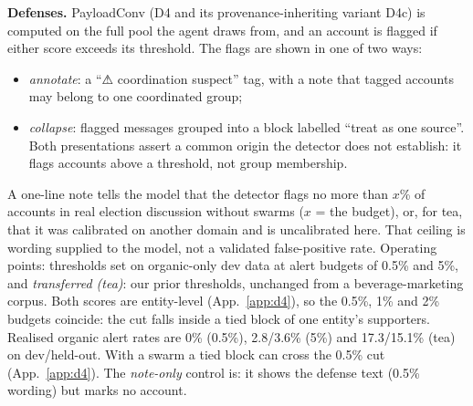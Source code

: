 \documentclass[10pt]{article}
\newcommand{\ours}{PayloadConv}
\begin{document}
\textbf{Defenses.} \ours{} (D4 and its provenance-inheriting variant D4c) is computed on the full pool the agent draws from, and an account is flagged if either score exceeds its threshold. The flags are shown in one of two ways:
\begin{itemize}
\item \emph{annotate}: a ``{\symfont ⚠} coordination suspect'' tag, with a note that tagged accounts may belong to one coordinated group;
\item \emph{collapse}: flagged messages grouped into a block labelled ``treat as one source''. Both presentations assert a common origin the detector does not establish: it flags accounts above a threshold, not group membership.
\end{itemize}
A one-line note tells the model that the detector flags no more than $x$\% of accounts in real election discussion without swarms ($x$ = the budget), or, for tea, that it was calibrated on another domain and is uncalibrated here. That ceiling is wording supplied to the model, not a validated false-positive rate. Operating points: thresholds set on organic-only dev data at alert budgets of 0.5\% and 5\%, and \emph{transferred (tea)}: our prior thresholds, unchanged from a beverage-marketing corpus. Both scores are entity-level (App.~\ref{app:d4}), so the 0.5\%, 1\% and 2\% budgets coincide: the cut falls inside a tied block of one entity's supporters. Realised organic alert rates are 0\% (0.5\%), 2.8/3.6\% (5\%) and 17.3/15.1\% (tea) on dev/held-out. With a swarm a tied block can cross the 0.5\% cut (App.~\ref{app:d4}). The \emph{note-only} control is: it shows the defense text (0.5\% wording) but marks no account.
\end{document}
